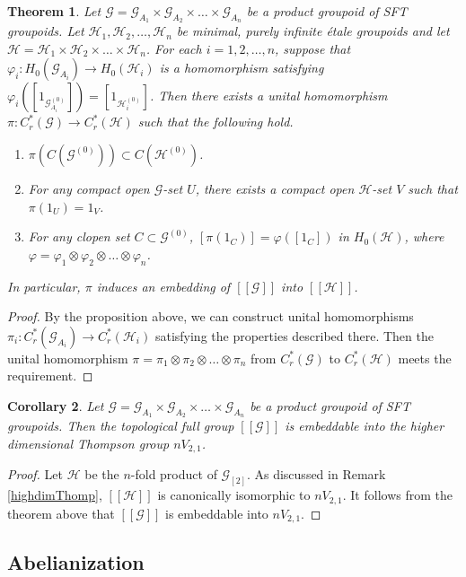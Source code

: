 \documentclass[11pt]{article}
\newtheorem{theorem}{Theorem}[section]
\newtheorem{corollary}[theorem]{Corollary}
\theoremstyle{definition}
\numberwithin{equation}{section}
\renewcommand{\phi}{\varphi}
\newcommand{\G}{\mathcal{G}}
\renewcommand{\H}{\mathcal{H}}
\begin{document}
\begin{theorem}\label{embedding}
Let $\G=\G_{A_1}\times\G_{A_2}\times\dots\times\G_{A_n}$ be 
a product groupoid of SFT groupoids. 
Let $\H_1,\H_2,\dots,\H_n$ be minimal, purely infinite \'etale groupoids 
and let $\H=\H_1\times\H_2\times\dots\times\H_n$. 
For each $i=1,2,\dots,n$, 
suppose that $\phi_i:H_0(\G_{A_i})\to H_0(\H_i)$ is a homomorphism 
satisfying $\phi_i([1_{\G_{A_i}^{(0)}}])=[1_{\H_i^{(0)}}]$. 
Then there exists a unital homomorphism 
$\pi:C^*_r(\G)\to C^*_r(\H)$ such that the following hold. 
\begin{enumerate}
\item $\pi(C(\G^{(0)}))\subset C(\H^{(0)})$. 
\item For any compact open $\G$-set $U$, 
there exists a compact open $\H$-set $V$ 
such that $\pi(1_U)=1_V$. 
\item For any clopen set $C\subset\G^{(0)}$, 
$[\pi(1_C)]=\phi([1_C])$ in $H_0(\H)$, 
where $\phi=\phi_1\otimes\phi_2\otimes\dots\otimes\phi_n$. 
\end{enumerate}
In particular, 
$\pi$ induces an embedding of $[[\G]]$ into $[[\H]]$. 
\end{theorem}
\begin{proof}
By the proposition above, 
we can construct unital homomorphisms $\pi_i:C^*_r(\G_{A_i})\to C^*_r(\H_i)$ 
satisfying the properties described there. 
Then the unital homomorphism $\pi=\pi_1\otimes\pi_2\otimes\dots\otimes\pi_n$ 
from $C^*_r(\G)$ to $C^*_r(\H)$ meets the requirement. 
\end{proof}

\begin{corollary}
Let $\G=\G_{A_1}\times\G_{A_2}\times\dots\times\G_{A_n}$ be 
a product groupoid of SFT groupoids. 
Then the topological full group $[[\G]]$ is embeddable into 
the higher dimensional Thompson group $nV_{2,1}$. 
\end{corollary}
\begin{proof}
Let $\H$ be the $n$-fold product of $\G_{[2]}$. 
As discussed in Remark \ref{highdimThomp}, 
$[[\H]]$ is canonically isomorphic to $nV_{2,1}$. 
It follows from the theorem above that 
$[[\G]]$ is embeddable into $nV_{2,1}$. 
\end{proof}




\subsection{Abelianization}
\end{document}
